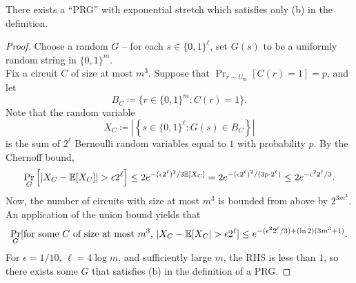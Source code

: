 		\begin{ftheo}
			There exists a ``PRG'' with exponential stretch which satisfies only (b) in the definition.
		\end{ftheo}
		\begin{proof}
			Choose a random $G$ -- for each $s \in \{0,1\}^\ell$, set $G(s)$ to be a uniformly random string in $\{0,1\}^{m}$.\\
			Fix a circuit $C$ of size at most $m^3$. Suppose that $\Pr_{r \sim U_m}[C(r) = 1] = p$, and let
			\[ B_C \coloneqq \{ r \in \{0,1\}^m : C(r) = 1 \}. \]
			Note that the random variable
			\[ X_C \coloneqq \left| \left\{ s \in \{0,1\}^\ell : G(s) \in B_C \right\} \right| \]
			is the sum of $2^{\ell}$ Bernoulli random variables equal to $1$ with probability $p$. By the Chernoff bound,
			\[ \Pr_G\left[ |X_C - \mathbb{E}[X_C]| > \epsilon 2^\ell \right] \le 2e^{-(\epsilon 2^\ell)^2/3\mathbb{E}[X_C]} = 2e^{-(\epsilon 2^\ell)^2 /(3p \cdot 2^{\ell})} \le 2e^{-\epsilon^2 2^{\ell} / 3}. \]
			Now, the number of circuits with size at most $m^3$ is bounded from above by $2^{3m^3}$. An application of the union bound yields that
			\[ \Pr_G[ \text{for some $C$ of size at most $m^3$, } |X_C - \mathbb{E}[X_C| > \epsilon 2^\ell ] \le e^{-(\epsilon^2 2^\ell/3) + (\ln 2)(3m^3 + 1)}. \]
			For $\epsilon = 1/10$, $\ell = 4\log m$, and sufficiently large $m$, the RHS is less than $1$, so there exists some $G$ that satisfies (b) in the definition of a PRG.
		\end{proof}